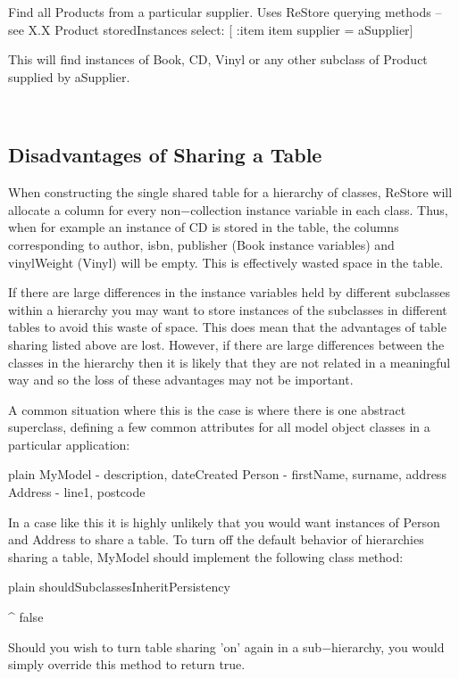 \documentclass[10pt,twoside,english]{_support/latex/sbabook/sbabook}
\begin{document}
Find all Products from a particular supplier. Uses ReStore querying methods – see X.X 
Product storedInstances select: {[} :item \textbar{} item supplier = aSupplier{]}
 
This will find instances of Book, CD, Vinyl or any other subclass of Product supplied by aSupplier.

 
\subsection{Disadvantages of Sharing a Table }
When constructing the single shared table for a hierarchy of classes, ReStore will allocate a column for every non−collection instance variable in each class. Thus, when for example an instance of CD is stored in the table, the columns corresponding to author, isbn, publisher (Book instance variables) and vinylWeight (Vinyl) will be empty. This is effectively wasted space in the table. 

If there are large differences in the instance variables held by different subclasses within a hierarchy you may want to store instances of the subclasses in different tables to avoid this waste of space. This does mean that the advantages of table sharing listed above are lost. However, if there are large differences between the classes in the hierarchy then it is likely that they are not related in a meaningful way and so the loss of these advantages may not be important. 

A common situation where this is the case is where there is one abstract superclass, defining a few common attributes for all model object classes in a particular application: 

\begin{displaycode}{plain}
 MyModel	 	- description, dateCreated
	Person		- firstName, surname, address
	Address 	- line1, postcode
\end{displaycode}

In a case like this it is highly unlikely that you would want instances of Person and Address to share a table. To turn off the default behavior of hierarchies sharing a table, MyModel should implement the following class method: 

\begin{displaycode}{plain}
shouldSubclassesInheritPersistency 

	^ false
\end{displaycode}

Should you wish to turn table sharing 'on' again in a sub−hierarchy, you would simply override this method to return true. 
\end{document}
